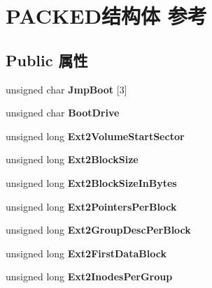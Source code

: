 \hypertarget{struct_p_a_c_k_e_d}{}\section{P\+A\+C\+K\+E\+D结构体 参考}
\label{struct_p_a_c_k_e_d}
\subsection*{Public 属性}
\begin{DoxyCompactItemize}
\item 
\mbox{\label{struct_p_a_c_k_e_d_a36969c1933cdb3243a1c9a3a8b6249d2}} 
unsigned char {\bfseries Jmp\+Boot} \mbox{[}3\mbox{]}
\item 
\mbox{\label{struct_p_a_c_k_e_d_a70fe2eaccb6e63710a35bf2ae0b700f2}} 
unsigned char {\bfseries Boot\+Drive}
\item 
\mbox{\label{struct_p_a_c_k_e_d_af16afaef9d02ead6570c5a982b5ac258}} 
unsigned long {\bfseries Ext2\+Volume\+Start\+Sector}
\item 
\mbox{\label{struct_p_a_c_k_e_d_ab7a99c60e814291ca2da107eb400313b}} 
unsigned long {\bfseries Ext2\+Block\+Size}
\item 
\mbox{\label{struct_p_a_c_k_e_d_aa3fccad27a3ff833ed0b9ba1d422849d}} 
unsigned long {\bfseries Ext2\+Block\+Size\+In\+Bytes}
\item 
\mbox{\label{struct_p_a_c_k_e_d_a9c240aacf5bfb3f8dc410d6c40646dd3}} 
unsigned long {\bfseries Ext2\+Pointers\+Per\+Block}
\item 
\mbox{\label{struct_p_a_c_k_e_d_af71e386776b3e0ad3318f240a2fdc9f9}} 
unsigned long {\bfseries Ext2\+Group\+Desc\+Per\+Block}
\item 
\mbox{\label{struct_p_a_c_k_e_d_a9c7afe1f3e3e88a4c2ddb10e7adf3129}} 
unsigned long {\bfseries Ext2\+First\+Data\+Block}
\item 
\mbox{\label{struct_p_a_c_k_e_d_a4c8706d0754b69e294a1ff5e2326f7b6}} 
unsigned long {\bfseries Ext2\+Inodes\+Per\+Group}

\end{DoxyCompactItemize}
